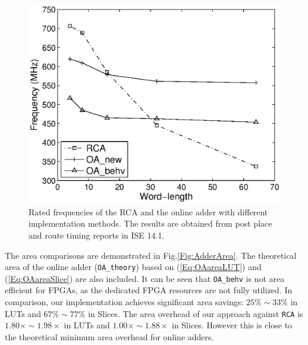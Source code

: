 \documentclass[conference]{IEEEtran}
\begin{document}
\begin{figure}[tbp]
	\centering
	\includegraphics[width=.45\textwidth]{./Figures/Exp/Adder_Freq.eps}
	\caption{Rated frequencies of the RCA and the online adder with different implementation methods. The results are obtained from post place and route timing reports in ISE 14.1.}
	\label{Fig:AdderFreq}
\end{figure}

The area comparisons are demonstrated in Fig.\ref{Fig:AdderArea}. The theoretical area of the online adder (\texttt{OA\_theory}) based on (\ref{Eq:OAareaLUT}) and (\ref{Eq:OAareaSlice}) are also included. It can be seen that \texttt{OA\_behv} is not area efficient for FPGAs, as the dedicated FPGA resources are not fully utilized. In comparison, our implementation achieves significant area savings: $25\%\sim 33\%$ in LUTs and $67\%\sim77\%$ in Slices. The area overhead of our approach against \texttt{RCA} is $1.80\times\sim1.98\times$
in LUTs and $1.00\times\sim1.88\times$ in Slices. However this is close to the theoretical minimum area overhead for online adders.
\end{document}
